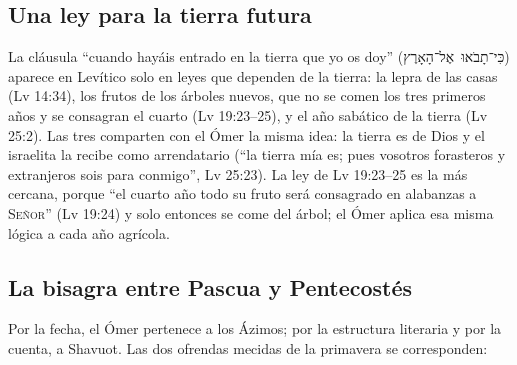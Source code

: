 \documentclass[11pt,letterpaper]{article}
\newcommand{\heb}[1]{\mbox{\foreignlanguage{hebrew}{#1}}}
\newcommand{\SENOR}{\textsc{Señor}}
\begin{document}
\subsection{Una ley para la tierra futura}
La cláusula ``cuando hayáis entrado en la tierra que yo os doy'' (\heb{כִּי־תָבֹאוּ אֶל־הָאָרֶץ}) aparece en Levítico solo en leyes que dependen de la tierra: la lepra de las casas (Lv 14:34), los frutos de los árboles nuevos, que no se comen los tres primeros años y se consagran el cuarto (Lv 19:23--25), y el año sabático de la tierra (Lv 25:2). Las tres comparten con el Ómer la misma idea: la tierra es de Dios y el israelita la recibe como arrendatario (``la tierra mía es; pues vosotros forasteros y extranjeros sois para conmigo'', Lv 25:23). La ley de Lv 19:23--25 es la más cercana, porque ``el cuarto año todo su fruto será consagrado en alabanzas a \SENOR'' (Lv 19:24) y solo entonces se come del árbol; el Ómer aplica esa misma lógica a cada año agrícola.

\subsection{La bisagra entre Pascua y Pentecostés}
Por la fecha, el Ómer pertenece a los Ázimos; por la estructura literaria y por la cuenta, a Shavuot. Las dos ofrendas mecidas de la primavera se corresponden:
\end{document}
